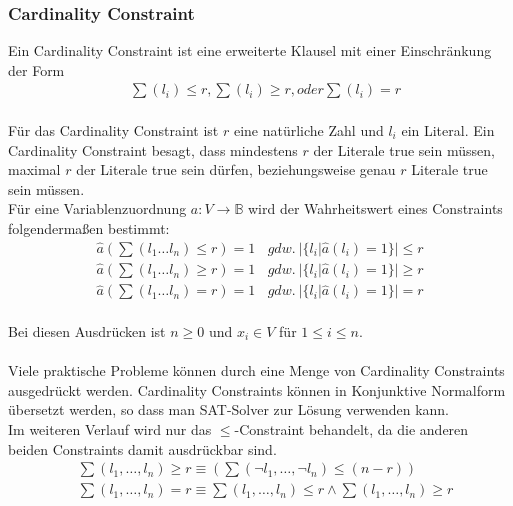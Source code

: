 \documentclass[a4,abstract=on]{scrartcl}
\begin{document}
\subsubsection{Cardinality Constraint}\label{baseCad}
Ein Cardinality Constraint \cite[vgl.][]{sinz} ist eine erweiterte Klausel mit einer Einschränkung der Form 
\begin{align*}
&\sum (l_i) \leq r, \sum (l_i) \geq r, oder \sum (l_i) = r
\end{align*}
\ \\
Für das Cardinality Constraint ist $r$ eine natürliche Zahl und $l_i$ ein Literal. Ein Cardinality Constraint besagt, dass mindestens $r$ der Literale true sein müssen, maximal $r$ der Literale true sein dürfen, beziehungsweise genau $r$ Literale true sein müssen.\\
Für eine Variablenzuordnung $a:V \rightarrow \mathbb{B}$ wird der Wahrheitswert eines Constraints folgendermaßen bestimmt:
\begin{align*}
\hat{a} (\sum(l_1 \dots l_n ) \leq r) = 1 {~~~~} gdw. {~} |\{l_i|\hat{a} (l_i) = 1\}| \leq r \\
\hat{a} (\sum(l_1 \dots l_n ) \geq r) = 1 {~~~~} gdw. {~} |\{l_i|\hat{a} (l_i) = 1\}| \geq r \\
\hat{a} (\sum(l_1 \dots l_n ) = r) = 1 {~~~~} gdw. {~} |\{l_i|\hat{a} (l_i) = 1\}| = r 
\end{align*}
\ \\
Bei diesen Ausdrücken ist $n\geq 0$ und $x_i \in V$ für $1 \leq i \leq n$.\\
\ \\
Viele praktische Probleme können durch eine Menge von Cardinality Constraints ausgedrückt werden. Cardinality Constraints können in Konjunktive Normalform übersetzt werden, so dass man SAT-Solver zur Lösung verwenden kann.\\
Im weiteren Verlauf wird nur das $\leq$-Constraint behandelt, da die anderen beiden Constraints damit ausdrückbar sind.
\begin{align*}
&\sum (l_1, \dots, l_n) \geq r \equiv (\sum (\neg l_1, \dots, \neg l_n) \leq (n-r))\\
&\sum(l_1, \dots, l_n) = r \equiv \sum(l_1, \dots, l_n) \leq r \wedge \sum(l_1, \dots, l_n) \geq r
\end{align*}
\end{document}
